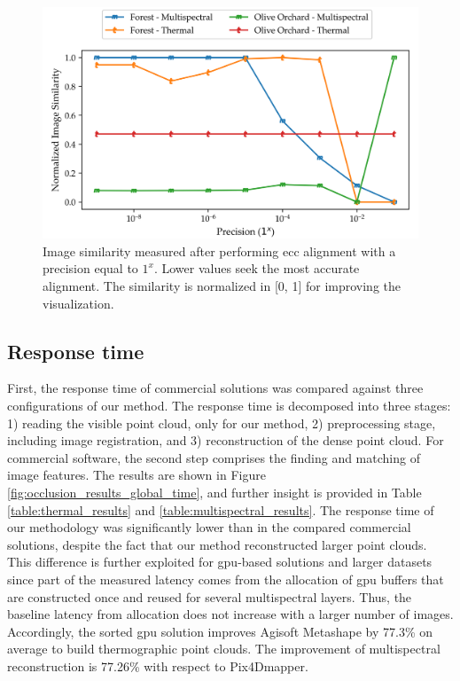 \begin{figure}[ht]
    \centering
    \includegraphics[width=\linewidth]{figs/multi_thermal_projection/results/ecc_precision.png}
    \caption{Image similarity measured after performing \acrshort{ecc} alignment with a precision equal to $1^x$. Lower values seek the most accurate alignment. The similarity is normalized in [0, 1] for improving the visualization. }
    \label{fig:ecc_precision}
\end{figure}

\subsection{Response time}

First, the response time of commercial solutions was compared against three configurations of our method. The response time is decomposed into three stages: 1) reading the visible point cloud, only for our method, 2) preprocessing stage, including image registration, and 3) reconstruction of the dense point cloud. For commercial software, the second step comprises the finding and matching of image features. The results are shown in Figure \ref{fig:occlusion_results_global_time}, and further insight is provided in Table \ref{table:thermal_results} and \ref{table:multispectral_results}. The response time of our methodology was significantly lower than in the compared commercial solutions, despite the fact that our method reconstructed larger point clouds. This difference is further exploited for \acrshort{gpu}-based solutions and larger datasets since part of the measured latency comes from the allocation of \acrshort{gpu} buffers that are constructed once and reused for several multispectral layers. Thus, the baseline latency from allocation does not increase with a larger number of images. Accordingly, the sorted \acrshort{gpu} solution improves Agisoft Metashape by 77.3\% on average to build thermographic point clouds. The improvement of multispectral reconstruction is 77.26\% with respect to Pix4Dmapper. 

